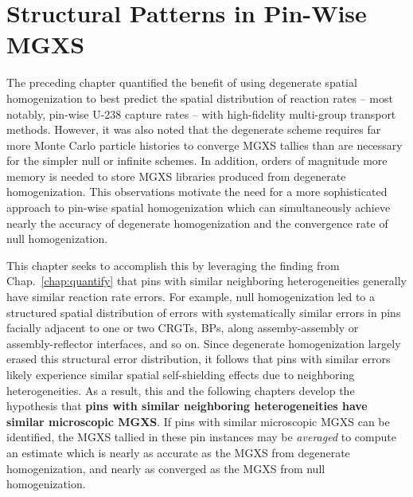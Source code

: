 \chapter{Structural Patterns in Pin-Wise MGXS}
\label{chap:spatial}

The preceding chapter quantified the benefit of using degenerate spatial homogenization to best predict the spatial distribution of reaction rates -- most notably, pin-wise U-238 capture rates -- with high-fidelity multi-group transport methods. However, it was also noted that the degenerate scheme requires far more Monte Carlo particle histories to converge \ac{MGXS} tallies than are necessary for the simpler null or infinite schemes. In addition, orders of magnitude more memory is needed to store \ac{MGXS} libraries produced from degenerate homogenization. This observations motivate the need for a more sophisticated approach to pin-wise spatial homogenization which can simultaneously achieve nearly the accuracy of degenerate homogenization and the convergence rate of null homogenization.

This chapter seeks to accomplish this by leveraging the finding from Chap.~\ref{chap:quantify} that pins with similar neighboring heterogeneities generally have similar reaction rate errors. For example, null homogenization led to a structured spatial distribution of errors with systematically similar errors in pins facially adjacent to one or two \acp{CRGT}, \acp{BP}, along assemby-assembly or assembly-reflector interfaces, and so on. Since degenerate homogenization largely erased this structural error distribution, it follows that pins with similar errors likely experience similar spatial self-shielding effects due to neighboring heterogeneities. As a result, this and the following chapters develop the hypothesis that \textbf{pins with similar neighboring heterogeneities have similar microscopic \ac{MGXS}}. If pins with similar microscopic \ac{MGXS} can be identified, the \ac{MGXS} tallied in these pin instances may be \textit{averaged} to compute an estimate which is nearly as accurate as the \ac{MGXS} from degenerate homogenization, and nearly as converged as the \ac{MGXS} from null homogenization. 

